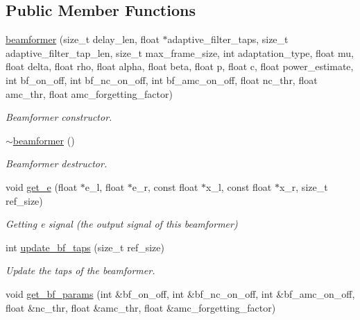 \subsection*{Public Member Functions}
\begin{DoxyCompactItemize}
\item 
\hyperlink{classbeamformer_a30c14263a887cada41e51dffd39991c8}{beamformer} (size\+\_\+t delay\+\_\+len, float $\ast$adaptive\+\_\+filter\+\_\+taps, size\+\_\+t adaptive\+\_\+filter\+\_\+tap\+\_\+len, size\+\_\+t max\+\_\+frame\+\_\+size, int adaptation\+\_\+type, float mu, float delta, float rho, float alpha, float beta, float p, float c, float power\+\_\+estimate, int bf\+\_\+on\+\_\+off, int bf\+\_\+nc\+\_\+on\+\_\+off, int bf\+\_\+amc\+\_\+on\+\_\+off, float nc\+\_\+thr, float amc\+\_\+thr, float amc\+\_\+forgetting\+\_\+factor)
\begin{DoxyCompactList}\small\item\em Beamformer constructor. \end{DoxyCompactList}\item 
\mbox{\label{classbeamformer_abedc8820adb8711f5fe9f9786bdcbcbf}} 
\hyperlink{classbeamformer_abedc8820adb8711f5fe9f9786bdcbcbf}{$\sim$beamformer} ()
\begin{DoxyCompactList}\small\item\em Beamformer destructor. \end{DoxyCompactList}\item 
void \hyperlink{classbeamformer_a557285c2c9ba3cc59cb73db8e5e823ed}{get\+\_\+e} (float $\ast$e\+\_\+l, float $\ast$e\+\_\+r, const float $\ast$x\+\_\+l, const float $\ast$x\+\_\+r, size\+\_\+t ref\+\_\+size)
\begin{DoxyCompactList}\small\item\em Getting e signal (the output signal of this beamformer) \end{DoxyCompactList}\item 
int \hyperlink{classbeamformer_a5c98a192f70faf7dc3f354f677bec4ee}{update\+\_\+bf\+\_\+taps} (size\+\_\+t ref\+\_\+size)
\begin{DoxyCompactList}\small\item\em Update the taps of the beamformer. \end{DoxyCompactList}\item 
void \hyperlink{classbeamformer_af3f89821c2cd4e52a9ed634d0d73aa3a}{get\+\_\+bf\+\_\+params} (int \&bf\+\_\+on\+\_\+off, int \&bf\+\_\+nc\+\_\+on\+\_\+off, int \&bf\+\_\+amc\+\_\+on\+\_\+off, float \&nc\+\_\+thr, float \&amc\+\_\+thr, float \&amc\+\_\+forgetting\+\_\+factor)

\end{DoxyCompactItemize}
